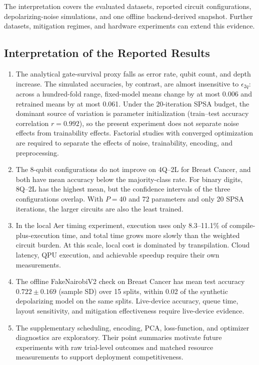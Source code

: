 \documentclass[final,5p,times,number]{elsarticle}
\begin{document}
The interpretation covers the evaluated datasets, reported circuit configurations, depolarizing-noise simulations, and one offline backend-derived snapshot. Further datasets, mitigation regimes, and hardware experiments can extend this evidence.

\subsection{Interpretation of the Reported Results}

\begin{enumerate}[leftmargin=*]
  \item The analytical gate-survival proxy falls as error rate, qubit count, and depth increase. The simulated accuracies, by contrast, are almost insensitive to $\epsilon_{2q}$: across a hundred-fold range, fixed-model means change by at most 0.006 and retrained means by at most 0.061. Under the 20-iteration SPSA budget, the dominant source of variation is parameter initialization (train--test accuracy correlation $r=0.992$), so the present experiment does not separate noise effects from trainability effects. Factorial studies with converged optimization are required to separate the effects of noise, trainability, encoding, and preprocessing.

  \item The 8-qubit configurations do not improve on 4Q--2L for Breast Cancer, and both have mean accuracy below the majority-class rate. For binary digits, 8Q--2L has the highest mean, but the confidence intervals of the three configurations overlap. With $P=40$ and $72$ parameters and only 20 SPSA iterations, the larger circuits are also the least trained.

  \item In the local Aer timing experiment, execution uses only 8.3--11.1\% of compile-plus-execution time, and total time grows more slowly than the weighted circuit burden. At this scale, local cost is dominated by transpilation. Cloud latency, QPU execution, and achievable speedup require their own measurements.

  \item The offline FakeNairobiV2 check on Breast Cancer has mean test accuracy $0.722\pm0.169$ (sample SD) over 15 splits, within 0.02 of the synthetic depolarizing model on the same splits. Live-device accuracy, queue time, layout sensitivity, and mitigation effectiveness require live-device evidence.

  \item The supplementary scheduling, encoding, PCA, loss-function, and optimizer diagnostics are exploratory. Their point summaries motivate future experiments with raw trial-level outcomes and matched resource measurements to support deployment competitiveness.
\end{enumerate}
\end{document}
